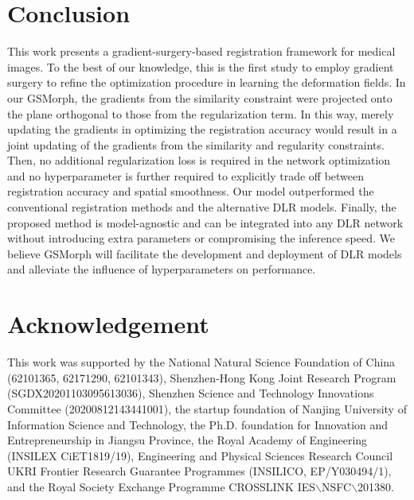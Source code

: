 \documentclass[runningheads]{llncs}
\begin{document}
\section{Conclusion}
This work presents a gradient-surgery-based registration framework for medical images. 
To the best of our knowledge, this is the first study to employ gradient surgery to refine the optimization procedure in learning the deformation fields. In our GSMorph, the gradients from the similarity constraint were projected onto the plane orthogonal to those from the regularization term. In this way, merely updating the gradients in optimizing the registration accuracy would result in a joint updating of the gradients from the similarity and regularity constraints. 
Then, no additional regularization loss is required in the network optimization and no hyperparameter is further required to explicitly trade off between registration accuracy and spatial smoothness. Our model outperformed the conventional registration methods and the alternative DLR models. Finally, the proposed method is model-agnostic and can be integrated into any DLR network without introducing extra parameters or compromising the inference speed. 
We believe GSMorph will facilitate the development and deployment of DLR models and alleviate the influence of hyperparameters on performance.

\section{Acknowledgement}
This work was supported by the National Natural Science Foundation of China (62101365, 62171290, 62101343), Shenzhen-Hong Kong Joint Research Program (SGDX20201103095613036), Shenzhen Science and Technology Innovations Committee (20200812143441001), the startup foundation of Nanjing University of Information Science and Technology, the Ph.D. foundation for Innovation and Entrepreneurship in Jiangsu Province, the Royal Academy of Engineering (INSILEX CiET1819/19), Engineering and Physical Sciences Research Council UKRI Frontier Research Guarantee Programmes (INSILICO, EP/Y030494/1), and the Royal Society Exchange Programme CROSSLINK  IES$\backslash$NSFC$\backslash$201380.
%
%
%


%
\end{document}
